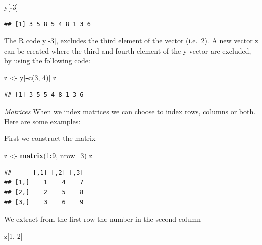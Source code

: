\documentclass[]{book}
\newenvironment{Shaded}{\begin{snugshade}}{\end{snugshade}}
\newcommand{\KeywordTok}[1]{\textcolor[rgb]{0.13,0.29,0.53}{\textbf{#1}}}
\newcommand{\DataTypeTok}[1]{\textcolor[rgb]{0.13,0.29,0.53}{#1}}
\newcommand{\DecValTok}[1]{\textcolor[rgb]{0.00,0.00,0.81}{#1}}
\newcommand{\StringTok}[1]{\textcolor[rgb]{0.31,0.60,0.02}{#1}}
\newcommand{\OperatorTok}[1]{\textcolor[rgb]{0.81,0.36,0.00}{\textbf{#1}}}
\newcommand{\NormalTok}[1]{#1}
\theoremstyle{definition}
\theoremstyle{definition}
\theoremstyle{definition}
\theoremstyle{remark}
\begin{document}
\begin{Shaded}
\begin{Highlighting}[]
\NormalTok{y[}\OperatorTok{-}\DecValTok{3}\NormalTok{]}
\end{Highlighting}
\end{Shaded}

\begin{verbatim}
## [1] 3 5 8 5 4 8 1 3 6
\end{verbatim}

The R code y{[}-3{]}, excludes the third element of the vector (i.e.~2).
A new vector z can be created where the third and fourth element of the
y vector are excluded, by using the following code:

\begin{Shaded}
\begin{Highlighting}[]
\NormalTok{z <-}\StringTok{ }\NormalTok{y[}\OperatorTok{-}\KeywordTok{c}\NormalTok{(}\DecValTok{3}\NormalTok{, }\DecValTok{4}\NormalTok{)]}
\NormalTok{z}
\end{Highlighting}
\end{Shaded}

\begin{verbatim}
## [1] 3 5 5 4 8 1 3 6
\end{verbatim}

\emph{Matrices} When we index matrices we can choose to index rows,
columns or both. Here are some examples:

First we construct the matrix

\begin{Shaded}
\begin{Highlighting}[]
\NormalTok{z <-}\StringTok{ }\KeywordTok{matrix}\NormalTok{(}\DecValTok{1}\OperatorTok{:}\DecValTok{9}\NormalTok{, }\DataTypeTok{nrow=}\DecValTok{3}\NormalTok{)}
\NormalTok{z}
\end{Highlighting}
\end{Shaded}

\begin{verbatim}
##      [,1] [,2] [,3]
## [1,]    1    4    7
## [2,]    2    5    8
## [3,]    3    6    9
\end{verbatim}

We extract from the first row the number in the second column

\begin{Shaded}
\begin{Highlighting}[]
\NormalTok{z[}\DecValTok{1}\NormalTok{, }\DecValTok{2}\NormalTok{]}
\end{Highlighting}
\end{Shaded}
\end{document}
